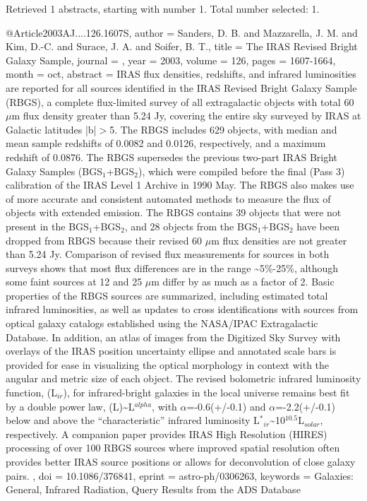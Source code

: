 \documentclass[longauth]{aa}
\begin{document}
{{{{{Retrieved 1 abstracts, starting with number 1.  Total number selected: 1.

@Article{2003AJ....126.1607S,
  author   = {Sanders, D. B. and Mazzarella, J. M. and Kim, D.-C. and Surace, J. A. and Soifer, B. T.},
  title    = {The IRAS Revised Bright Galaxy Sample},
  journal  = {\aj},
  year     = {2003},
  volume   = {126},
  pages    = {1607-1664},
  month    = oct,
  abstract = {IRAS flux densities, redshifts, and infrared luminosities are reported
for all sources identified in the IRAS Revised Bright Galaxy Sample
(RBGS), a complete flux-limited survey of all extragalactic objects with
total 60 {$\mu$}m flux density greater than 5.24 Jy, covering the entire
sky surveyed by IRAS at Galactic latitudes |b|$\gt$5{\deg}. The RBGS
includes 629 objects, with median and mean sample redshifts of 0.0082
and 0.0126, respectively, and a maximum redshift of 0.0876. The RBGS
supersedes the previous two-part IRAS Bright Galaxy Samples
(BGS$_{1}$+BGS$_{2}$), which were compiled before the final
(Pass 3) calibration of the IRAS Level 1 Archive in 1990 May. The RBGS
also makes use of more accurate and consistent automated methods to
measure the flux of objects with extended emission. The RBGS contains 39
objects that were not present in the BGS$_{1}$+BGS$_{2}$,
and 28 objects from the BGS$_{1}$+BGS$_{2}$ have been
dropped from RBGS because their revised 60 {$\mu$}m flux densities are not
greater than 5.24 Jy. Comparison of revised flux measurements for
sources in both surveys shows that most flux differences are in the
range \~{}5\%-25\%, although some faint sources at 12 and 25 {$\mu$}m differ by
as much as a factor of 2. Basic properties of the RBGS sources are
summarized, including estimated total infrared luminosities, as well as
updates to cross identifications with sources from optical galaxy
catalogs established using the NASA/IPAC Extragalactic Database. In
addition, an atlas of images from the Digitized Sky Survey with overlays
of the IRAS position uncertainty ellipse and annotated scale bars is
provided for ease in visualizing the optical morphology in context with
the angular and metric size of each object. The revised bolometric
infrared luminosity function, {\phis}(L$_{ir}$), for
infrared-bright galaxies in the local universe remains best fit by a
double power law, {\phis}(L)\~{}L$^{alpha}$, with
{$\alpha$}=-0.6(+/-0.1) and {$\alpha$}=-2.2(+/-0.1) below and above the
``characteristic'' infrared luminosity
L$^{*}$$_{ir}$\~{}10$^{10.5}$L$_{solar}$,
respectively. A companion paper provides IRAS High Resolution (HIRES)
processing of over 100 RBGS sources where improved spatial resolution
often provides better IRAS source positions or allows for deconvolution
of close galaxy pairs.
},
  doi      = {10.1086/376841},
  eprint   = {astro-ph/0306263},
  keywords = {Galaxies: General, Infrared Radiation},
}
Query Results from the ADS Database


}}}}}
\end{document}
